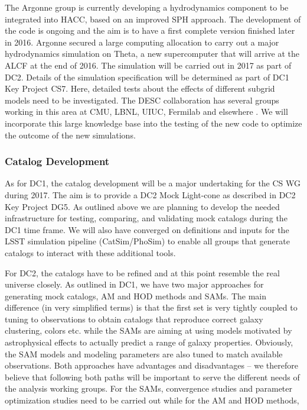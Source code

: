 The Argonne group is currently developing a hydrodynamics component to be integrated into HACC, based on an improved SPH approach. The development of the code is ongoing and the aim is to have a first complete version finished later in 2016. Argonne secured a large computing allocation to carry out a major hydrodynamics simulation on Theta, a new supercomputer that will arrive at the ALCF at the end of 2016. The simulation will be carried out in 2017 as part of DC2. Details of the simulation specification will be determined as part of DC1 Key Project CS7. Here, detailed tests about the effects of different subgrid models need to be investigated. The DESC collaboration has several groups working in this area at CMU, LBNL, UIUC, Fermilab and elsewhere . We will incorporate this large knowledge base into the testing of the new code to optimize the outcome of the new simulations.



\subsubsection{Catalog Development}
\label{sec:keysims:dc2:dev}

As for DC1, the catalog development will be a major undertaking for the CS WG during 2017. The aim is to provide a DC2 Mock Light-cone as described in DC2 Key Project DG5. As outlined above we are planning to develop the needed infrastructure for testing, comparing, and validating mock catalogs during the DC1 time frame. We will also have converged on definitions and inputs for the LSST simulation pipeline (CatSim/PhoSim) to enable all groups that generate catalogs to interact with these additional tools. 

For DC2, the catalogs have to be refined and at this point resemble the real universe closely. As outlined in DC1, we have two major approaches for generating mock catalogs, AM and HOD methods and SAMs. The main difference (in very simplified terms) is that the first set is very tightly coupled to tuning to observations to obtain catalogs that reproduce correct galaxy clustering, colors etc. while the SAMs are aiming at using models motivated by astrophysical effects to actually predict a range of galaxy properties. Obviously, the SAM models and modeling parameters are also tuned to match available observations. Both approaches have advantages and disadvantages -- we therefore believe that following both paths will be important to serve the different needs of the analysis working groups. For the SAMs, convergence studies and parameter optimization studies need to be carried out while for the AM and HOD methods, 

